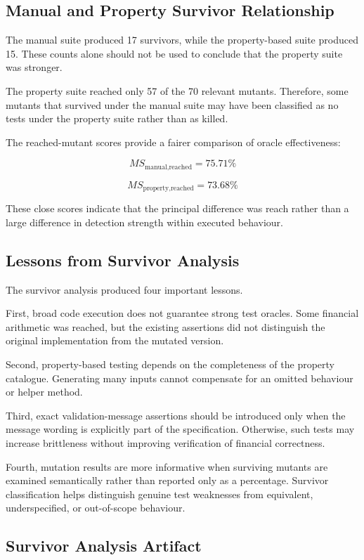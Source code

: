 \documentclass[12pt]{article}
\begin{document}
\subsection{Manual and Property Survivor Relationship}

The manual suite produced 17 survivors, while the property-based suite produced
15. These counts alone should not be used to conclude that the property suite
was stronger.

The property suite reached only 57 of the 70 relevant mutants. Therefore, some
mutants that survived under the manual suite may have been classified as no
tests under the property suite rather than as killed.

The reached-mutant scores provide a fairer comparison of oracle effectiveness:

\[
MS_{\text{manual,reached}} = 75.71\%
\]

\[
MS_{\text{property,reached}} = 73.68\%
\]

These close scores indicate that the principal difference was reach rather than
a large difference in detection strength within executed behaviour.

\subsection{Lessons from Survivor Analysis}

The survivor analysis produced four important lessons.

First, broad code execution does not guarantee strong test oracles. Some
financial arithmetic was reached, but the existing assertions did not
distinguish the original implementation from the mutated version.

Second, property-based testing depends on the completeness of the property
catalogue. Generating many inputs cannot compensate for an omitted behaviour
or helper method.

Third, exact validation-message assertions should be introduced only when the
message wording is explicitly part of the specification. Otherwise, such tests
may increase brittleness without improving verification of financial
correctness.

Fourth, mutation results are more informative when surviving mutants are
examined semantically rather than reported only as a percentage. Survivor
classification helps distinguish genuine test weaknesses from equivalent,
underspecified, or out-of-scope behaviour.

\subsection{Survivor Analysis Artifact}
\end{document}
